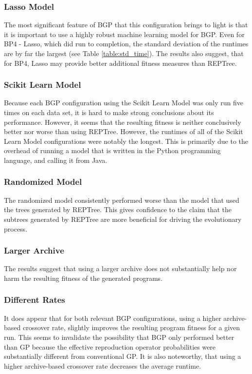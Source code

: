 \subsubsection{Lasso Model}
The most significant feature of BGP that this configuration brings to light is that it is important to use a highly robust machine learning model for BGP.  Even for BP4 - Lasso, which did run to completion, the standard deviation of the runtimes are by far the largest (see Table \ref{table:std_time}).  The results also suggest, that for BP4, Lasso may provide better additional fitness measures than REPTree.

\subsubsection{Scikit Learn Model}
Because each BGP configuration using the Scikit Learn Model was only run five times on each data set, it is hard to make strong conclusions about its performance.  However, it seems that the resulting fitness is neither conclusively better nor worse than using REPTree.  However, the runtimes of all of the Scikit Learn Model configurations were notably the longest.  This is primarily due to the overhead of running a model that is written in the Python programming language, and calling it from Java.

\subsubsection{Randomized Model}
The randomized model consistently performed worse than the model that used the trees generated by REPTree.  This gives confidence to the claim that the subtrees generated by REPTree are more beneficial for driving the evolutionary process. 

\subsubsection{Larger Archive}
The results suggest that using a larger archive does not substantially help nor harm the resulting fitness of the generated programs.

\subsubsection{Different Rates}
It does appear that for both relevant BGP configurations, using a higher archive-based crossover rate, slightly improves the resulting program fitness for a given run.  This seems to invalidate the possibility that BGP only performed better than GP because the effective reproduction operator probabilities were substantially different from conventional GP.  It is also noteworthy, that using a higher archive-based crossover rate decreases the average runtime.


